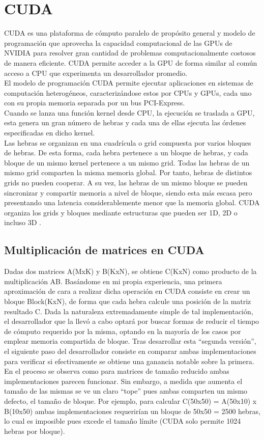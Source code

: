 \section{CUDA}
CUDA es una plataforma de cómputo paralelo de propósito general y modelo de programación que aprovecha la capacidad computacional de las GPUs de NVIDIA para resolver gran cantidad de problemas computacionalmente costosos de manera eficiente. CUDA permite acceder a la GPU de forma similar al común acceso a CPU que experimenta un desarrollador promedio. \\
El modelo de programación CUDA permite ejecutar aplicaciones en sistemas de computación heterogéneos, caracterizándose estos por CPUs y GPUs, cada uno con su propia memoria separada por un bus PCI-Express. \\
Cuando se lanza una función kernel desde CPU, la ejecución se traslada a GPU, esta genera un gran número de hebras y cada una de ellas ejecuta las órdenes especificadas en dicho kernel. \\
Las hebras se organizan en una cuadrícula o grid compuesta por varios bloques de hebras. De esta forma, cada hebra pertenece a un bloque de hebras, y cada bloque de un mismo kernel pertenece a un mismo grid. Todas las hebras de un mismo grid comparten la misma memoria global. Por tanto, hebras de distintos grids no pueden cooperar. A su vez, las hebras de un mismo bloque se pueden sincronizar y compartir memoria a nivel de bloque, siendo esta más escasa pero presentando una latencia considerablemente menor que la memoria global. CUDA organiza los grids y bloques mediante estructuras que pueden ser 1D, 2D o incluso 3D \cite{Professional_CUDA_C}.
\subsection{Multiplicación de matrices en CUDA}

Dadas dos matrices A(MxK) y B(KxN), se obtiene C(KxN) como producto de la multiplicación AB. Basándome en mi propia experiencia, una primera aproximación de cara a realizar dicha operación en CUDA consiste en crear un bloque Block(KxN), de forma que cada hebra calcule una posición de la matriz resultado C. Dada la naturaleza extremadamente simple de tal implementación, el desarrollador que la llevó a cabo optará por buscar formas de reducir el tiempo de cómputo requerido por la misma, optando en la mayoría de los casos por emplear memoria compartida de bloque. Tras desarrollar esta ``segunda versión'', el siguiente paso del desarrollador consiste en comparar ambas implementaciones para verificar si efectivamente se obtiene una ganancia notable sobre la primera. En el proceso se observa como para matrices de tamaño reducido ambas implementaciones parecen funcionar. Sin embargo, a medida que aumenta el tamaño de las mismas se ve un claro ``tope'' pues ambas comparten un mismo defecto, el tamaño de bloque. Por ejemplo, para calcular C(50x50) = A(50x10) x B(10x50) ambas implementaciones requerirían un bloque de 50x50 = 2500 hebras, lo cual es imposible pues excede el tamaño límite (CUDA solo permite 1024 hebras por bloque). \\

